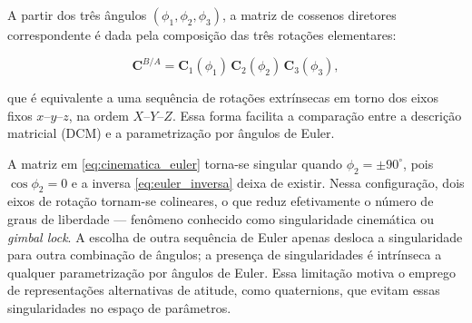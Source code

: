 A partir dos três ângulos $(\phi_1,\phi_2,\phi_3)$, a matriz de cossenos diretores correspondente é dada pela composição das três rotações elementares:

\begin{equation}
\mathbf{C}^{B/A}
=
\mathbf{C}_1(\phi_1)\,\mathbf{C}_2(\phi_2)\,\mathbf{C}_3(\phi_3),
\end{equation}

que é equivalente a uma sequência de rotações extrínsecas em torno dos eixos fixos $x$–$y$–$z$, na ordem $X$–$Y$–$Z$. Essa forma facilita a comparação entre a descrição matricial (DCM) e a parametrização por ângulos de Euler.

A matriz em \eqref{eq:cinematica_euler} torna-se singular quando
$\phi_2 = \pm 90^\circ$, pois $\cos\phi_2 = 0$ e a inversa
\eqref{eq:euler_inversa} deixa de existir. Nessa configuração, dois eixos de
rotação tornam-se colineares, o que reduz efetivamente o número de graus de
liberdade — fenômeno conhecido como singularidade cinemática ou
\emph{gimbal lock}. A escolha de outra sequência de Euler apenas desloca a
singularidade para outra combinação de ângulos; a presença de singularidades é
intrínseca a qualquer parametrização por ângulos de Euler. Essa limitação motiva
o emprego de representações alternativas de atitude, como quaternions, que
evitam essas singularidades no espaço de parâmetros.
